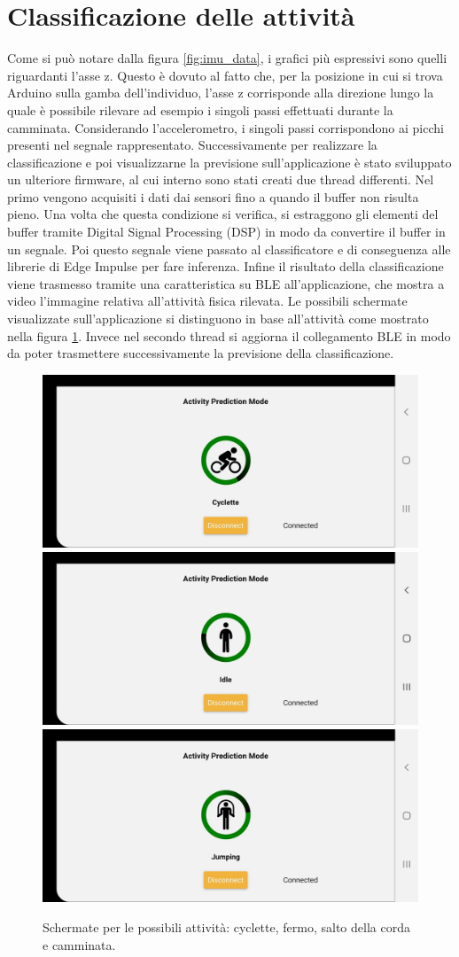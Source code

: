 \section{Classificazione delle attività}
Come si può notare dalla figura \ref{fig:imu_data}, i grafici più espressivi sono quelli riguardanti l'asse z. Questo è dovuto al fatto che, per la posizione in cui si trova Arduino sulla gamba dell'individuo, l'asse z corrisponde alla direzione lungo la quale è possibile rilevare ad esempio i singoli passi effettuati durante la camminata. Considerando l'accelerometro, i singoli passi corrispondono ai picchi presenti nel segnale rappresentato.
Successivamente per realizzare la classificazione e poi visualizzarne la previsione sull'applicazione è stato sviluppato un ulteriore firmware, al cui interno sono stati creati due thread differenti.
Nel primo vengono acquisiti i dati dai sensori fino a quando il buffer non risulta pieno. Una volta che questa condizione si verifica, si estraggono gli elementi del buffer tramite Digital Signal Processing (DSP) in modo da convertire il buffer in un segnale. Poi questo segnale viene passato al classificatore e di conseguenza alle librerie di Edge Impulse per fare inferenza.
Infine il risultato della classificazione viene trasmesso tramite una caratteristica su BLE all'applicazione, che mostra a video l'immagine relativa all'attività fisica rilevata. Le possibili schermate visualizzate sull'applicazione si distinguono in base all'attività come mostrato nella figura \ref{fig:attivitafisica}.
Invece nel secondo thread si aggiorna il collegamento BLE in modo da poter trasmettere successivamente la previsione della classificazione.
\begin{figure}[tbh]
	\centering
	\includegraphics[width=0.4\linewidth]{./ImageFiles/cyclette}
	\includegraphics[width=0.4\linewidth]{./ImageFiles/idle}
	\includegraphics[width=0.4\linewidth]{./ImageFiles/jumping}
	\caption{Schermate per le possibili attività: cyclette, fermo, salto della corda e camminata.}
	\label{fig:attivitafisica}
\end{figure}

